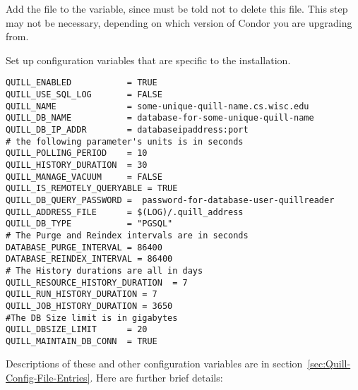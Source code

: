 \begin{description}
\item Add the file  to the 
   variable, since  must
  be told not to delete this file.
  This step may not be necessary, depending on which version of Condor 
  you are upgrading from. 
 
\item Set up configuration variables that are specific
  to the installation.
\footnotesize
\begin{verbatim}
QUILL_ENABLED           = TRUE
QUILL_USE_SQL_LOG       = FALSE
QUILL_NAME              = some-unique-quill-name.cs.wisc.edu
QUILL_DB_NAME           = database-for-some-unique-quill-name
QUILL_DB_IP_ADDR        = databaseipaddress:port
# the following parameter's units is in seconds
QUILL_POLLING_PERIOD    = 10
QUILL_HISTORY_DURATION 	= 30
QUILL_MANAGE_VACUUM     = FALSE
QUILL_IS_REMOTELY_QUERYABLE = TRUE
QUILL_DB_QUERY_PASSWORD =  password-for-database-user-quillreader
QUILL_ADDRESS_FILE      = $(LOG)/.quill_address
QUILL_DB_TYPE           = "PGSQL"
# The Purge and Reindex intervals are in seconds
DATABASE_PURGE_INTERVAL	= 86400
DATABASE_REINDEX_INTERVAL = 86400
# The History durations are all in days 
QUILL_RESOURCE_HISTORY_DURATION  = 7
QUILL_RUN_HISTORY_DURATION = 7
QUILL_JOB_HISTORY_DURATION = 3650
#The DB Size limit is in gigabytes
QUILL_DBSIZE_LIMIT      = 20
QUILL_MAINTAIN_DB_CONN  = TRUE

\end{verbatim}
\normalsize

\end{description}


Descriptions of these and other configuration variables are in
section~\ref{sec:Quill-Config-File-Entries}.
Here are further brief details:

